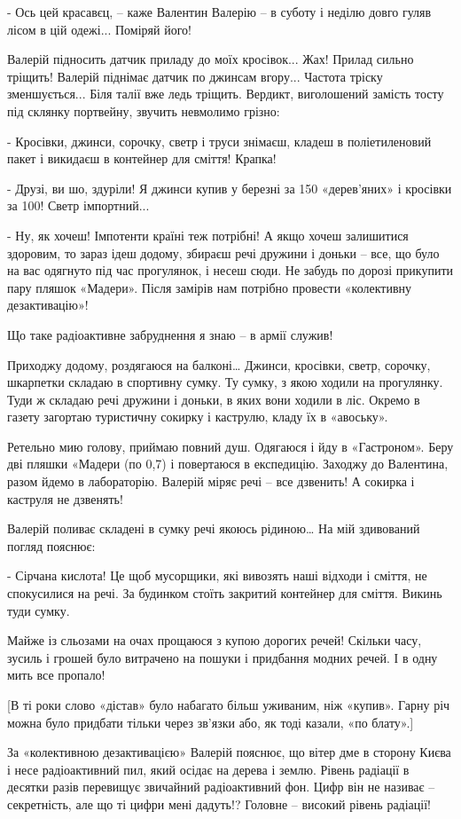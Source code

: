 - Ось цей красавєц, – каже Валентин Валерію – в суботу і неділю довго гуляв
лісом в цій одежі... Поміряй його!

Валерій підносить датчик приладу до моїх кросівок... Жах! Прилад сильно тріщить!
Валерій піднімає датчик по джинсам вгору... Частота тріску зменшується... Біля
талії вже ледь тріщить. Вердикт, виголошений замість тосту під склянку
портвейну, звучить невмолимо грізно:

- Кросівки, джинси, сорочку, светр і труси знімаєш, кладеш в поліетиленовий
пакет і викидаєш в контейнер для сміття! Крапка!

- Друзі, ви шо, здуріли! Я джинси купив у березні за 150 «дерев’яних» і
кросівки за 100! Светр імпортний... 

- Ну, як хочеш! Імпотенти країні теж потрібні! А якщо хочеш залишитися
здоровим, то зараз ідеш додому, збираєш речі дружини і доньки – все, що було на
вас одягнуто під час прогулянок, і несеш сюди. Не забудь по дорозі прикупити
пару пляшок «Мадери». Після замірів нам потрібно провести «колективну
дезактивацію»!

Що таке радіоактивне забруднення я знаю – в армії служив!

Приходжу додому, роздягаюся на балконі… Джинси, кросівки, светр, сорочку,
шкарпетки складаю в спортивну сумку. Ту сумку, з якою ходили на прогулянку.
Туди ж складаю речі дружини і доньки, в яких вони ходили в ліс. Окремо в газету
загортаю туристичну сокирку і каструлю, кладу їх в «авоську». 

Ретельно мию голову, приймаю повний душ. Одягаюся і йду в «Гастроном». Беру дві
пляшки «Мадери (по 0,7) і повертаюся в експедицію. Заходжу до Валентина, разом
йдемо в лабораторію. Валерій міряє речі – все дзвенить! А сокирка і каструля не
дзвенять!

Валерій поливає складені в сумку речі якоюсь рідиною… На мій здивований погляд
пояснює:

- Сірчана кислота! Це щоб мусорщики, які вивозять наші відходи і сміття, не
спокусилися на речі. За будинком стоїть закритий контейнер для сміття. Викинь
туди сумку.

Майже із сльозами на очах прощаюся з купою дорогих речей! Скільки часу, зусиль
і грошей було витрачено на пошуки і придбання модних речей. І в одну мить все
пропало! 

[В ті роки слово «дістав» було набагато більш уживаним, ніж «купив». Гарну річ
можна було придбати тільки через зв’язки або, як тоді казали, «по блату».]

За «колективною дезактивацією» Валерій пояснює, що вітер дме в сторону Києва і
несе радіоактивний пил, який осідає на дерева і землю. Рівень радіації в
десятки разів перевищує звичайний радіоактивний фон. Цифр він не називає –
секретність, але що ті цифри мені дадуть!? Головне – високий рівень радіації!

